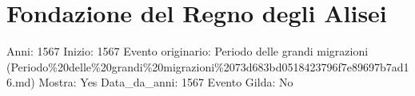 \section{Fondazione del Regno degli
Alisei}\label{fondazione-del-regno-degli-alisei}

Anni: 1567 Inizio: 1567 Evento originario: Periodo delle grandi
migrazioni
(Periodo\%20delle\%20grandi\%20migrazioni\%2073d683bd0518423796f7e89697b7ad16.md)
Mostra: Yes Data\_da\_anni: 1567 Evento Gilda: No
